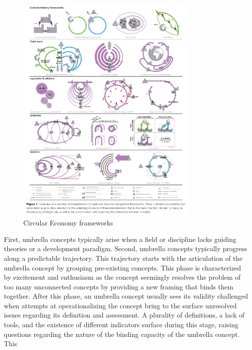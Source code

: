 \begin{figure}[h!]
    \centering
    \includegraphics[width=0.8\textwidth]{sections/asset/ce_frameworks.PNG}
    \caption{Circular Economy frameworks}
    \label{fig:ce_frameworks}
\end{figure}

First, umbrella concepts typically arise when a field or discipline lacks guiding theories or a development paradigm.
Second, umbrella concepts typically progress along a predictable trajectory. This trajectory starts with the articulation of the umbrella concept by grouping pre-existing concepts. This phase is characterized by excitement and enthusiasm as the concept seemingly resolves the problem of too many unconnected concepts by providing a new framing that binds them together. After this phase, an umbrella concept usually sees its validity challenged when attempts at operationalizing the concept bring to the surface unresolved issues regarding its definition and assessment. A plurality of definitions, a lack of tools, and the existence of different indicators surface during this stage, raising questions regarding the nature of the binding capacity of the umbrella concept. This

